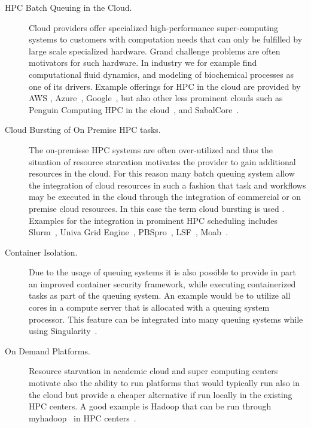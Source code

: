 \documentclass[final,5p,times,twocolumn]{elsarticle}
\begin{document}
\begin{description}

\item[HPC Batch Queuing in the Cloud.] Cloud providers offer specialized
  high-performance super-computing systems to
  customers with computation needs that can only be fulfilled by large
  scale specialized hardware. Grand challenge problems are often
  motivators for such hardware. In industry we for example find
  computational fluid dynamics, and modeling of biochemical processes
  as one of its drivers. Example offerings for HPC in the cloud are
  provided by AWS
  \cite{www-aws-hpc}, Azure~\cite{www-azure-hpc}, Google~\cite{www-google-hpc},
  but also other less prominent clouds such as Penguin Computing HPC
  in the cloud~\cite{PODHPCCloud2019}, and
  SabalCore~\cite{Sabalcore2019}.
  
\item[Cloud Bursting of On Premise HPC tasks.] The on-premisse HPC
  systems are often over-utilized and thus the situation of resource
  starvation motivates the provider to gain additional resources
  in the cloud. For this reason many batch queuing
  system allow the integration of cloud resources in such a fashion
  that task and workflows may be executed in the cloud through the
  integration of commercial or on premise cloud resources. In this
  case the term cloud bursting is used
  \cite{CloudBursting2019,BurstingHPC2019}. Examples for the
  integration in prominent HPC scheduling includes
  Slurm~\cite{www-slurm}, Univa Grid Engine~\cite{www-univa},
  PBSpro~\cite{www-pbs-manual}, LSF~\cite{www-lsf},
  Moab~\cite{www-moab}.

\item[Container Isolation.] Due to the usage of queuing systems it is
  also possible to provide in part an improved container security
  framework, while executing containerized tasks as part of the
  queuing system. An example would be to utilize all cores in a
  compute server that is allocated with a queuing system
  processor. This feature can be integrated into many queuing systems
  while using Singularity~\cite{www-singularity}.

\item[On Demand Platforms.] Resource starvation in academic cloud and
  super computing centers motivate also the ability to run platforms
  that would typically run also in the cloud but provide a cheaper
  alternative if run locally in the existing HPC centers. A good
  example is Hadoop that can be run through
  myhadoop~\cite{krishnan2011myhadoop} in HPC centers~\cite{SDSC2019}.


\end{description}
\end{document}
